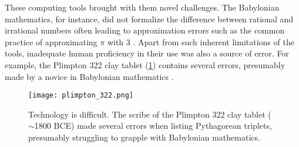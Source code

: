 These computing tools brought with them novel challenges. The Babylonian mathematics, for instance, did not formalize the difference between rational and irrational numbers often leading to approximation errors such as the common practice of approximating $\pi$ with 3 \parencite{georges_universal_2001}. Apart from such inherent limitations of the tools, inadequate human proficiency in their use was also a source of error. For example, the Plimpton 322 clay tablet (\cref{fig:plimpton_332}) contains several errors, presumably made by a novice in Babylonian mathematics \parencite{neugebauer_mathematical_1945,britton_plimpton_2011}. 

\begin{figure}
    \centering
    \texttt{[image: plimpton\_322.png]}
    \caption[Technology is difficult. The scribe of the Plimpton 322 clay tablet ($\sim$1800 BCE) made several errors when listing Pythagorean triplets.]{ Technology is difficult. The scribe of the Plimpton 322 clay tablet ($\sim$1800 BCE) made several errors when listing Pythagorean triplets, presumably struggling to grapple with Babylonian mathematics. \parencite[photo credit][]{neugebauer_mathematical_1945}}
    \label{fig:plimpton_332}
\end{figure}

